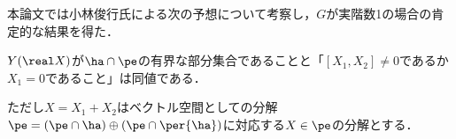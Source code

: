 本論文では小林俊行氏による次の予想について考察し，$G$が実階数1の場合の肯定的な結果を得た．
\begin{yosou*}
    $Y(\real X)$が$ \ha\cap \pe$の有界な部分集合であることと「$   [X_1, X_2]\neq 0 $であるか$X_1 = 0$であること」は同値である．

  ただし$X = X_1 + X_2 $はベクトル空間としての分解$\pe =(\pe\cap \ha)\oplus(\pe\cap\per{\ha}) $に対応する$X\in \pe$の分解とする．
\end{yosou*}

